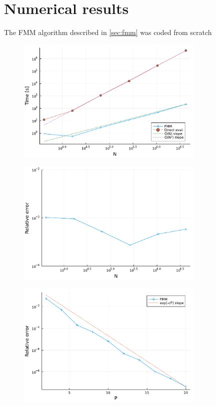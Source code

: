 \documentclass[final,onefignum,onetabnum]{siamart220329}
\begin{document}
\section{Numerical results}
The FMM algorithm described in \cref{sec:fmm} was coded from scratch



\begin{figure}[h!]
	\centering
	\includegraphics[width=0.8\textwidth]{nscaling}
	\caption{}
	\label{fig:}
\end{figure}
\begin{figure}[h!]
\centering
\includegraphics[width=0.8\textwidth]{errscaling}
\caption{}
\label{fig:}
\end{figure}
\begin{figure}[h!]
\centering
\includegraphics[width=0.8\textwidth]{perror}
\caption{}
\label{fig:}
\end{figure}
\end{document}
